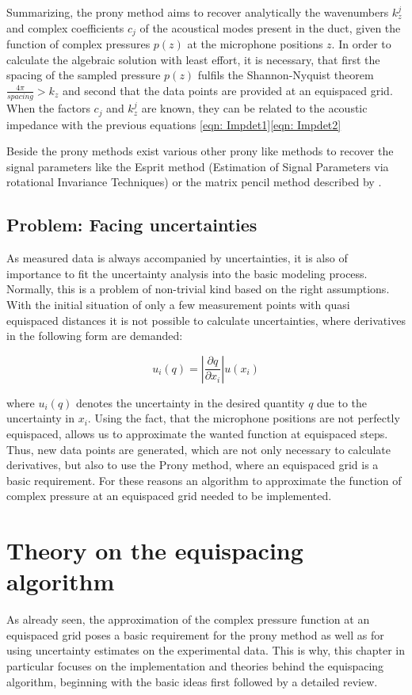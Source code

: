 \documentclass[11pt]{report} %
\begin{document}
Summarizing, the prony method aims to recover analytically the wavenumbers $k_z^{j}$ and complex coefficients $c_{j}$ of the acoustical modes present in the duct, given the function of complex pressures $p(z)$ at the microphone positions $z$. 
In order to calculate the algebraic solution with least effort, it is necessary, that first the spacing of the sampled pressure $p(z)$ fulfils the Shannon-Nyquist theorem $\frac{4\pi}{spacing}>k_z$ and second that the data points are provided at an equispaced grid.
When the factors $c_j$ and $k_z^j$ are known, they can be related to the acoustic impedance with the previous equations \eqref{eqn: Impdet1}\eqref{eqn: Impdet2}
 
Beside the prony methods exist various other prony like methods to recover the signal parameters like the Esprit method (Estimation of Signal Parameters via rotational Invariance Techniques) or the matrix pencil method described by \cite{Peter2011}.

\section{Problem: Facing uncertainties}
As measured data is always accompanied by uncertainties, it is also of importance to fit the uncertainty analysis into the basic modeling process.
Normally, this is a problem of non-trivial kind based on the right assumptions.
With the initial situation of only a few measurement points with quasi equispaced distances it is not possible to calculate uncertainties, where derivatives in the following form are demanded: 

\begin{equation}
u_{i}(q)= \left\vert \frac{\partial q}{\partial x_{i}} \right\vert u( x_{i})
\end{equation} \cite{Peerlings2017}

where $u_{i}(q)$ denotes the uncertainty in the desired quantity $q$ due to the uncertainty in $x_{i}$.
Using the fact, that the microphone positions are not perfectly equispaced, allows us to approximate the wanted function at equispaced steps.
Thus, new data points are generated, which are not only necessary to calculate derivatives, but also to use the Prony method, where an equispaced grid is a basic requirement.
For these reasons an algorithm to approximate the function of complex pressure at an equispaced grid needed to be implemented. 
  
\chapter{Theory on the equispacing algorithm} 
\label{chap:EquispaceTheory}
As already seen, the approximation of the complex pressure function at an equispaced grid poses a basic requirement for the prony method as well as for using uncertainty estimates on the experimental data.
This is why, this chapter in particular focuses on the implementation and theories behind the equispacing algorithm, beginning with the basic ideas first followed by a detailed review. 
\end{document}
